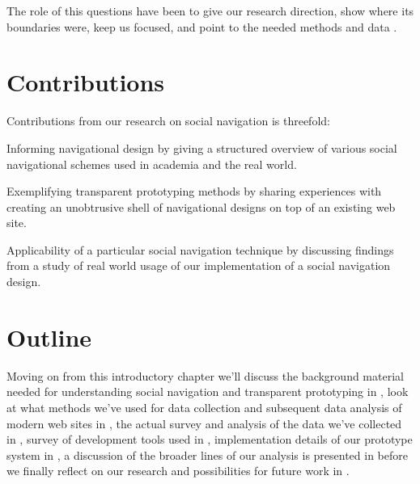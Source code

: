 The role of this questions have been to give our research direction, show
where its boundaries were, keep us focused, and point to the needed methods
and data \citep[]{silverman05}.


\section{Contributions}

Contributions from our research on social navigation is threefold:

\begin{enum}
  \item Informing navigational design by giving a structured overview of
    various social navigational schemes used in academia and the real world.
  \item Exemplifying transparent prototyping methods by sharing experiences
    with creating an unobtrusive shell of navigational designs on top of an
    existing web site.
  \item Applicability of a particular social navigation technique
    by discussing findings from a study of real world usage of our
    implementation of a social navigation design.
\end{enum}

\section{Outline}

Moving on from this introductory chapter we'll discuss the background
material needed for understanding social navigation and transparent
prototyping in ,
look at what methods we've used for data collection and subsequent data
analysis of modern web sites
in ,
the actual survey and analysis of the data we've collected in
,
survey of development tools used in
,
implementation details of our prototype system in
,
a discussion of the broader lines of our analysis is presented in
before we finally reflect on our research and possibilities for future work
in .
